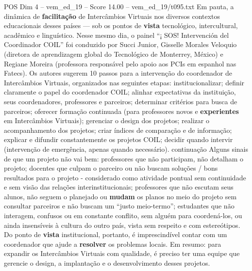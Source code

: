 \begin{textsample}{POS Dim 4 – vem\_ed\_19 – Score 14.00 – vem\_ed\_19/t095.txt}
Em pauta, a dinâmica de \textbf{facilitação} de Intercâmbios Virtuais nos diversos contextos educacionais desses países — sob os pontos de \textbf{vista} tecnológico, intercultural, acadêmico e linguístico.
Nesse mesmo dia, o painel “¡ SOS!
Intervención del Coordinador COIL” foi conduzido por Succi Junior, Gisselle Morales Veloquio (diretora de aprendizagem global do Tecnológico de Monterrey, México) e Regiane Moreira (professora responsável pelo apoio aos PCIs em espanhol nas Fatecs).
Os autores sugerem 10 passos para a intervenção do coordenador de Intercâmbios Virtuais, organizados nas seguintes etapas: institucionalizar; definir claramente o papel do coordenador COIL; alinhar expectativas da instituição, seus coordenadores, professores e parceiros; determinar critérios para busca de parceiros; oferecer formação continuada (para professores novos e \textbf{experientes} em Intercâmbios Virtuais); gerenciar o design dos projetos; realizar o acompanhamento dos projetos; criar índices de comparação e de informação; explicar e difundir constantemente os projetos COIL; decidir quando intervir (intervenção de emergência, apenas quando necessário). continuação Alguns sinais de que um projeto não vai bem: professores que não participam, não detalham o projeto; docentes que culpam o parceiro ou não buscam soluções / bons resultados para o projeto - considerado como atividade pontual sem continuidade e sem visão das relações interinstitucionais; professores que não escutam seus alunos, não seguem o planejado ou \textbf{mudam} os planos no meio do projeto sem consultar parceiros e não buscam um “justo meio-termo”; estudantes que não interagem, confusos ou em constante conflito, sem alguém para coordená-los, ou ainda insensíveis à cultura do outro país, vista sem respeito e com estereótipos.
Do ponto de \textbf{vista} institucional, portanto, é imprescindível contar com um coordenador que ajude a \textbf{resolver} os problemas locais.
Em resumo: para expandir os Intercâmbios Virtuais com qualidade, é preciso ter uma equipe que gerencie o design, a implantação e o desenvolvimento desses projetos.

\end{textsample}

